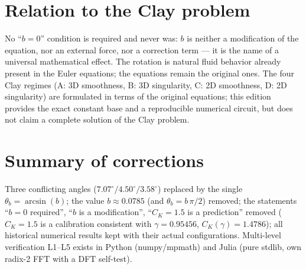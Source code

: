 \documentclass[11pt]{article}
\begin{document}
\section{Relation to the Clay problem}

No ``$b=0$'' condition is required and never was: $b$ is neither a modification
of the equation, nor an external force, nor a correction term --- it is the name
of a universal mathematical effect. The rotation is natural fluid behavior
already present in the Euler equations; the equations remain the original ones.
The four Clay regimes (A: 3D smoothness, B: 3D singularity, C: 2D smoothness,
D: 2D singularity) are formulated in terms of the original equations; this
edition provides the exact constant base and a reproducible numerical circuit,
but does not claim a complete solution of the Clay problem.

\section{Summary of corrections}

Three conflicting angles ($7.07^\circ/4.50^\circ/3.58^\circ$) replaced by the
single $\theta_b=\arcsin(b)$; the value $b\approx0.0785$ (and $\theta_b=b\,\pi/2$)
removed; the statements ``$b=0$ required'', ``$b$ is a modification'', ``$C_K=1.5$
is a prediction'' removed ($C_K=1.5$ is a calibration consistent with
$\gamma=0.95456$, $C_K(\gamma)=1.4786$); all historical numerical results kept
with their actual configurations. Multi-level verification L1--L5 exists in
Python (numpy/mpmath) and Julia (pure stdlib, own radix-2 FFT with a DFT
self-test).
\end{document}
